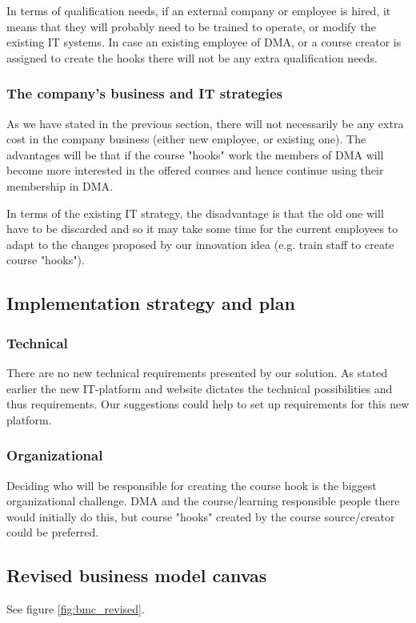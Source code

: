 In terms of qualification needs, if an external company or employee is hired, it means that they will probably need to be trained to operate, or modify the existing IT systems. In case an existing employee of DMA, or a course creator is assigned to create the hooks there will not be any extra qualification needs.

\subsubsection{The company's business and IT strategies}
As we have stated in the previous section, there will not necessarily be any extra cost in the company business (either new employee, or existing one). The advantages will be that if the course "hooks" work the members of DMA will become more interested in the offered courses and hence continue using their membership in DMA.

In terms of the existing IT strategy, the disadvantage is that the old one will have to be discarded and so it may take some time for the current employees to adapt to the changes proposed by our innovation idea (e.g. train staff to create course "hooks").

\subsection{Implementation strategy and plan}
\subsubsection{Technical}
There are no new technical requirements presented by our solution. As stated earlier the new IT-platform and website dictates the technical possibilities and thus requirements. Our suggestions could help to set up requirements for this new platform.

\subsubsection{Organizational}
Deciding who will be responsible for creating the course hook is the biggest organizational challenge. DMA and the course/learning responsible people there would initially do this, but course "hooks" created by the course source/creator could be preferred.

\subsection{Revised business model canvas}
See figure \ref{fig:bmc_revised}.

